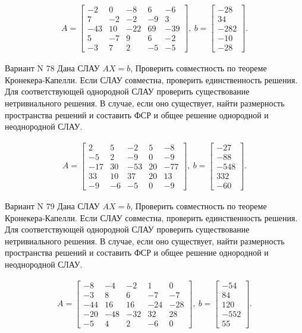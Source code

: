 \documentclass[11pt]{report}
\begin{document}
\begin{align*}
 A = \left[\begin{matrix}-2 & 0 & -8 & 6 & -6\\7 & -2 & -2 & -9 & 3\\-43 & 10 & -22 & 69 & -39\\5 & -7 & 9 & 6 & -2\\-3 & 7 & 2 & -5 & -5\end{matrix}\right],
\ b = \left[\begin{matrix}-28\\34\\-282\\-10\\-28\end{matrix}\right]. 
 \end{align*}

Вариант N 78
Дана СЛАУ $AX = b$,
Проверить совместность по теореме Кронекера-Капелли. Если СЛАУ совместна, проверить единственность решения.
Для соответствующей однородной СЛАУ проверить существование нетривиального решения. В случае, если оно существует,
найти размерность пространства решений и составить ФСР и общее решение однородной  и неоднородной СЛАУ.


\begin{align*}
 A = \left[\begin{matrix}2 & 5 & -2 & 5 & -8\\-5 & 2 & -9 & 0 & -9\\-17 & 30 & -53 & 20 & -77\\33 & 10 & 37 & 20 & 13\\-9 & -6 & -5 & 0 & -9\end{matrix}\right],
\ b = \left[\begin{matrix}-27\\-88\\-548\\332\\-60\end{matrix}\right]. 
 \end{align*}

Вариант N 79
Дана СЛАУ $AX = b$,
Проверить совместность по теореме Кронекера-Капелли. Если СЛАУ совместна, проверить единственность решения.
Для соответствующей однородной СЛАУ проверить существование нетривиального решения. В случае, если оно существует,
найти размерность пространства решений и составить ФСР и общее решение однородной  и неоднородной СЛАУ.


\begin{align*}
 A = \left[\begin{matrix}-8 & -4 & -2 & 1 & 0\\-3 & 8 & 6 & -7 & -7\\-44 & 16 & 16 & -24 & -28\\-20 & -48 & -32 & 32 & 28\\-5 & 4 & 2 & -6 & 0\end{matrix}\right],
\ b = \left[\begin{matrix}-54\\84\\120\\-552\\55\end{matrix}\right]. 
 \end{align*}
\end{document}
